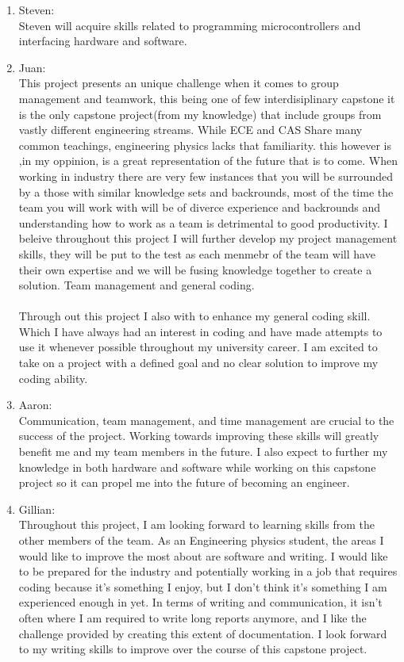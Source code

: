 \documentclass[12pt]{article}
\begin{document}
\begin{enumerate}
  \begin{enumerate}
    \item{Steven:}\\
    Steven will acquire skills related to programming microcontrollers and interfacing
    hardware and software. \\
    \item{Juan:}\\
    This project presents an unique challenge when it comes to group management and teamwork, this being one of few interdisiplinary capstone it is the only 
    capstone project(from my knowledge) that include groups from vastly different  engineering streams. While ECE and CAS Share many common teachings, engineering physics lacks that familiarity.
    this however is ,in my oppinion, is a great representation of the future that is to come. When working in industry there are very few instances that you will be surrounded by a those with similar knowledge sets 
    and backrounds, most of the time the team you will work with will be of diverce experience and backrounds and understanding how to work as a team is detrimental to good productivity. I beleive throughout this 
    project I will further develop my project management skills, they will be put to the test as each menmebr of the team will have their own expertise and we will be fusing knowledge together to create a solution.
    Team management and general coding.\\
    \\
    Through out this project I also with to enhance my general coding skill. Which I have always had an interest in coding and have made attempts to use it whenever possible throughout my university career. I am excited to 
    take on a project with a defined goal and no clear solution to improve my coding ability.
    \item{Aaron:}\\
    Communication, team management, and time management are 
    crucial to the success of the project. Working towards improving these skills will
    greatly benefit me and my team members in the future. I also expect to further my knowledge in
    both hardware and software while working on this capstone project so it 
    can propel me into the future of becoming an engineer.\\
    \item {Gillian:}\\
    Throughout this project, I am looking forward to learning skills from the other members of the team. As an Engineering physics student, the areas I would like to improve the most about are software and writing. I would like to be prepared for the industry and potentially working in a job that requires coding because it’s something I enjoy, but I don’t think it’s something I am experienced enough in yet. 
    \noindent In terms of writing and communication, it isn’t often where I am required to write long reports anymore, and I like the challenge provided by creating this extent of documentation. I look forward to my writing skills to improve over the course of this capstone project. 


\end{enumerate}
\end{enumerate}
\end{document}
